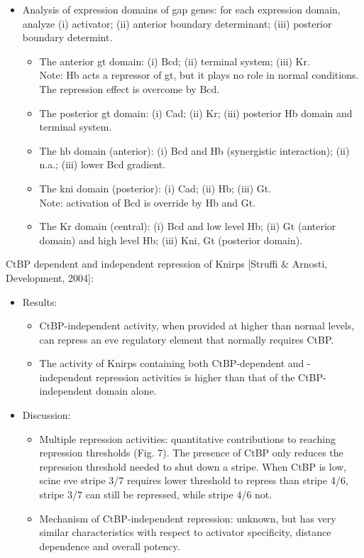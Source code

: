 \documentclass{report}
\begin{document}
\begin{enumerate}
\begin{itemize}
		\item Analysis of expression domains of gap genes: for each expression domain, analyze (i) activator; (ii) anterior boundary determinant; (iii) posterior boundary determint. 
		\begin{itemize}
			\item The anterior gt domain: (i) Bcd; (ii) terminal system; (iii) Kr. \\
			Note: Hb acts a repressor of gt, but it plays no role in normal conditions. The repression effect is overcome by Bcd. 
			\item The posterior gt domain: (i) Cad; (ii) Kr; (iii) posterior Hb domain and terminal system. 
			\item The hb domain (anterior): (i) Bcd and Hb (synergistic interaction); (ii) n.a.; (iii) lower Bcd gradient. 
			\item The kni domain (posterior): (i) Cad; (ii) Hb; (iii) Gt. \\
			Note: activation of Bcd is override by Hb and Gt. 
			\item The Kr domain (central): (i) Bcd and low level Hb; (ii) Gt (anterior domain) and high level Hb; (iii) Kni, Gt (posterior domain). 
		\end{itemize}
	\end{itemize}
	
	CtBP dependent and independent repression of Knirps [Struffi \& Arnosti, Development, 2004]:
	\begin{itemize}
		\item Results: 
		\begin{itemize} 
			\item CtBP-independent activity, when provided at higher than normal levels, can repress an eve regulatory element that normally requires CtBP. 
			\item The activity of Knirps containing both CtBP-dependent and -independent repression activities is higher than that of the CtBP-independent domain alone. 
		\end{itemize}
		
		\item Discussion: 
		\begin{itemize} 
			\item Multiple repression activities: quantitative contributions to reaching repression thresholds (Fig. 7). The presence of CtBP only reduces the repression threshold needed to shut down a stripe. When CtBP is low, scine eve stripe 3/7 requires lower threshold to repress than stripe 4/6, stripe 3/7 can still be repressed, while stripe 4/6 not. 
			\item Mechanism of CtBP-independent repression: unknown, but has very similar characteristics with respect to activator specificity, distance dependence and overall potency. 
		\end{itemize}
	\end{itemize}
	

\end{enumerate}
\end{document}
